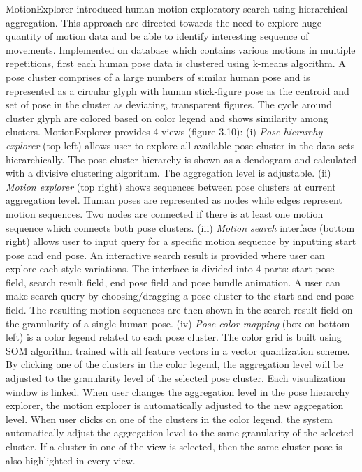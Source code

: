 MotionExplorer\cite{bernard2013} introduced human motion exploratory search using hierarchical aggregation. This approach are directed towards the need to explore huge quantity of motion data and be able to identify interesting sequence of movements. Implemented on database which contains various motions in multiple repetitions, first each human pose data is clustered using k-means algorithm. A pose cluster comprises of a large numbers of similar human pose and is represented as a circular glyph with human stick-figure pose as the centroid and set of pose in the cluster as deviating, transparent figures. The cycle around cluster glyph are colored based on color legend and shows similarity among clusters. MotionExplorer provides 4 views (figure 3.10): (i) \textit{Pose hierarchy explorer} (top left) allows user to explore all available pose cluster in the data sets hierarchically. The pose cluster hierarchy is shown as a dendogram and calculated with a divisive clustering algorithm. The aggregation level is adjustable. (ii) \textit{Motion explorer} (top right) shows sequences between pose clusters at current aggregation level. Human poses are represented as nodes while edges represent motion sequences. Two nodes are connected if there is at least one motion sequence which connects both pose clusters. (iii) \textit{Motion search} interface (bottom right) allows user to input query for a specific motion sequence by inputting start pose and end pose. An interactive search result is provided where user can explore each style variations. The interface is divided into 4 parts: start pose field, search result field, end pose field and pose bundle animation. A user can make search query by choosing/dragging a pose cluster to the start and end pose field. The resulting motion sequences are then shown in the search result field on the granularity of a single human pose. (iv) \textit{Pose color mapping} (box on bottom left) is a color legend related to each pose cluster. The color grid is built using SOM algorithm trained with all feature vectors in a vector quantization scheme. By clicking one of the clusters in the color legend, the aggregation level will be adjusted to the granularity level of the selected pose cluster. Each visualization window is linked. When user changes the aggregation level in the pose hierarchy explorer, the motion explorer is automatically adjusted to the new aggregation level. When user clicks on one of the clusters in the color legend, the system automatically adjust the aggregation level to the same granularity of the selected cluster. If a cluster in one of the view is selected, then the same cluster pose is also highlighted in every view. 

